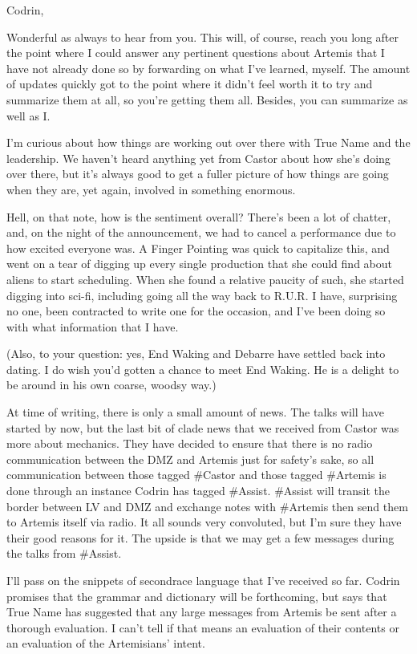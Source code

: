Codrin,

Wonderful as always to hear from you. This will, of course, reach you long after the point where I could answer any pertinent questions about Artemis that I have not already done so by forwarding on what I've learned, myself. The amount of updates quickly got to the point where it didn't feel worth it to try and summarize them at all, so you're getting them all. Besides, you can summarize as well as I.

I'm curious about how things are working out over there with True Name and the leadership. We haven't heard anything yet from Castor about how she's doing over there, but it's always good to get a fuller picture of how things are going when they are, yet again, involved in something enormous.

Hell, on that note, how is the sentiment overall? There's been a lot of chatter, and, on the night of the announcement, we had to cancel a performance due to how excited everyone was. A Finger Pointing was quick to capitalize this, and went on a tear of digging up every single production that she could find about aliens to start scheduling. When she found a relative paucity of such, she started digging into sci-fi, including going all the way back to R.U.R. I have, surprising no one, been contracted to write one for the occasion, and I've been doing so with what information that I have.

(Also, to your question: yes, End Waking and Debarre have settled back into dating. I do wish you'd gotten a chance to meet End Waking. He is a delight to be around in his own coarse, woodsy way.)

At time of writing, there is only a small amount of news. The talks will have started by now, but the last bit of clade news that we received from Castor was more about mechanics. They have decided to ensure that there is no radio communication between the DMZ and Artemis just for safety's sake, so all communication between those tagged \#Castor and those tagged \#Artemis is done through an instance Codrin has tagged \#Assist. \#Assist will transit the border between LV and DMZ and exchange notes with \#Artemis then send them to Artemis itself via radio. It all sounds very convoluted, but I'm sure they have their good reasons for it. The upside is that we may get a few messages during the talks from \#Assist.

I'll pass on the snippets of secondrace language that I've received so far. Codrin promises that the grammar and dictionary will be forthcoming, but says that True Name has suggested that any large messages from Artemis be sent after a thorough evaluation. I can't tell if that means an evaluation of their contents or an evaluation of the Artemisians' intent.

